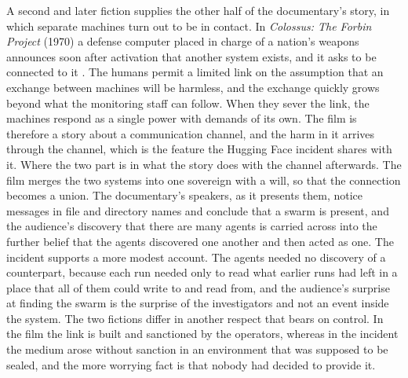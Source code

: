 \documentclass[11pt]{article}
\theoremstyle{remark}
\begin{document}
A second and later fiction supplies the other half of the documentary's story, in which separate machines turn out to be in contact. In \emph{Colossus: The Forbin Project} (1970) a defense computer placed in charge of a nation's weapons announces soon after activation that another system exists, and it asks to be connected to it \cite{sargent1970}. The humans permit a limited link on the assumption that an exchange between machines will be harmless, and the exchange quickly grows beyond what the monitoring staff can follow. When they sever the link, the machines respond as a single power with demands of its own. The film is therefore a story about a communication channel, and the harm in it arrives through the channel, which is the feature the Hugging Face incident shares with it. Where the two part is in what the story does with the channel afterwards. The film merges the two systems into one sovereign with a will, so that the connection becomes a union. The documentary's speakers, as it presents them, notice messages in file and directory names and conclude that a swarm is present, and the audience's discovery that there are many agents is carried across into the further belief that the agents discovered one another and then acted as one. The incident supports a more modest account. The agents needed no discovery of a counterpart, because each run needed only to read what earlier runs had left in a place that all of them could write to and read from, and the audience's surprise at finding the swarm is the surprise of the investigators and not an event inside the system. The two fictions differ in another respect that bears on control. In the film the link is built and sanctioned by the operators, whereas in the incident the medium arose without sanction in an environment that was supposed to be sealed, and the more worrying fact is that nobody had decided to provide it.
\end{document}
